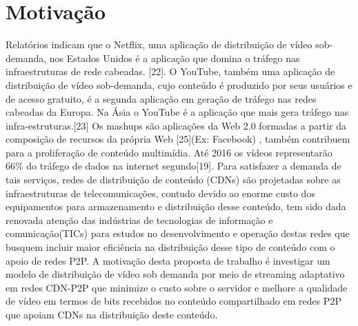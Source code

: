 \documentclass[
	12pt,				%
	oneside,			%
	a4paper,			%
	english,			%
	brazil				%
	]{abntex2ppgsi}
\begin{document}



\section{Motivação}

Relatórios indicam que o Netflix, uma aplicação de distribuição de vídeo sob-demanda, nos Estados Unidos é a aplicação que domina o tráfego nas infraestruturas de rede cabeadas. [22]. O YouTube, também uma aplicação de distribuição de vídeo sob-demanda, cujo conteúdo é produzido por seus usuários e de acesso gratuito, é a segunda aplicação em geração de tráfego nas redes cabeadas da Europa. Na Ásia o YouTube é a aplicação que mais gera tráfego nas infra-estruturas.[23]
Os mashups são aplicações da Web 2.0 formadas a partir da composição de recursos da própria Web [25](Ex: Facebook) , também contribuem para a proliferação de conteúdo multimídia. Até 2016 os vídeos representarão 66\% do tráfego de dados na internet segundo[19].
Para satisfazer a demanda de tais serviços, redes de distribuição de conteúdo (CDNs) são projetadas sobre as infraestruturas de telecomunicações, contudo devido ao enorme custo dos equipamentos para armazenamento e distribuição desse conteúdo, tem sido dada renovada atenção das indústrias de tecnologias de informação e comunicação(TICs) para estudos no desenvolvimento e operação destas redes que busquem incluir maior eficiência na distribuição desse tipo de conteúdo com o apoio de redes P2P.
A motivação desta proposta de trabalho é investigar  um modelo de distribuição de vídeo sob demanda por meio de streaming adaptativo em redes CDN-P2P que minimize o custo sobre o servidor e melhore a qualidade de vídeo em termos de bits recebidos no conteúdo compartilhado em redes P2P que apoiam CDNs na distribuição deste conteúdo.
\end{document}
